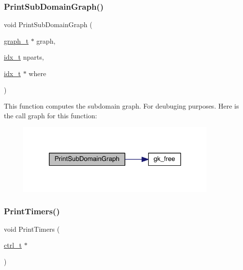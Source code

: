 \subsubsection{\texorpdfstring{Print\+Sub\+Domain\+Graph()}{PrintSubDomainGraph()}}
{\footnotesize\ttfamily void Print\+Sub\+Domain\+Graph (\begin{DoxyParamCaption}\item[{\hyperlink{a00734}{graph\+\_\+t} $\ast$}]{graph,  }\item[{\hyperlink{a00876_aaa5262be3e700770163401acb0150f52}{idx\+\_\+t}}]{nparts,  }\item[{\hyperlink{a00876_aaa5262be3e700770163401acb0150f52}{idx\+\_\+t} $\ast$}]{where }\end{DoxyParamCaption})}

This function computes the subdomain graph. For deubuging purposes. Here is the call graph for this function\+:\nopagebreak
\begin{figure}[H]
\begin{center}
\leavevmode
\includegraphics[width=284pt]{a00945_a9723ce68d6093abc3aca1086e672cde9_cgraph}
\end{center}
\end{figure}
\mbox{\label{a00945_adf9e4174fde5532ff96f490fa5abff7f}} 
\subsubsection{\texorpdfstring{Print\+Timers()}{PrintTimers()}}
{\footnotesize\ttfamily void Print\+Timers (\begin{DoxyParamCaption}\item[{\hyperlink{a00742}{ctrl\+\_\+t} $\ast$}]{ }\end{DoxyParamCaption})}

\mbox{\label{a00945_ab3d791e7adffa770602e257ecdaabd72}} 
